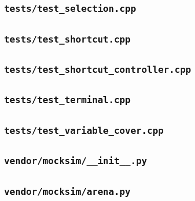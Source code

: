 \subsection*{\texttt{tests/test\_selection.cpp}}

\subsection*{\texttt{tests/test\_shortcut.cpp}}

\subsection*{\texttt{tests/test\_shortcut\_controller.cpp}}

\subsection*{\texttt{tests/test\_terminal.cpp}}

\subsection*{\texttt{tests/test\_variable\_cover.cpp}}

\subsection*{\texttt{vendor/mocksim/\_\_init\_\_.py}}

\subsection*{\texttt{vendor/mocksim/arena.py}}

